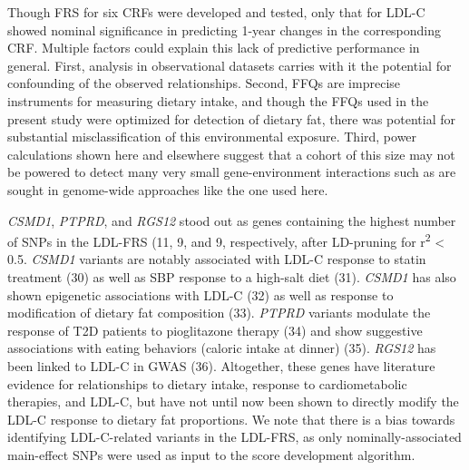 \documentclass[]{article}
\begin{document}
Though FRS for six CRFs were developed and tested, only that for LDL-C
showed nominal significance in predicting 1-year changes in the
corresponding CRF. Multiple factors could explain this lack of
predictive performance in general. First, analysis in observational
datasets carries with it the potential for confounding of the observed
relationships. Second, FFQs are imprecise instruments for measuring
dietary intake, and though the FFQs used in the present study were
optimized for detection of dietary fat, there was potential for
substantial misclassification of this environmental exposure. Third,
power calculations shown here and elsewhere suggest that a cohort of
this size may not be powered to detect many very small gene-environment
interactions such as are sought in genome-wide approaches like the one
used here.

\emph{CSMD1}, \emph{PTPRD}, and \emph{RGS12} stood out as genes
containing the highest number of SNPs in the LDL-FRS (11, 9, and 9,
respectively, after LD-pruning for r\textsuperscript{2} \textless{} 0.5.
\emph{CSMD1} variants are notably associated with LDL-C response to
statin treatment (30) as well as SBP response to a high-salt diet (31).
\emph{CSMD1} has also shown epigenetic associations with LDL-C (32) as
well as response to modification of dietary fat composition (33).
\emph{PTPRD} variants modulate the response of T2D patients to
pioglitazone therapy (34) and show suggestive associations with eating
behaviors (caloric intake at dinner) (35). \emph{RGS12} has been linked
to LDL-C in GWAS (36). Altogether, these genes have literature evidence
for relationships to dietary intake, response to cardiometabolic
therapies, and LDL-C, but have not until now been shown to directly
modify the LDL-C response to dietary fat proportions. We note that there
is a bias towards identifying LDL-C-related variants in the LDL-FRS, as
only nominally-associated main-effect SNPs were used as input to the
score development algorithm.
\end{document}
